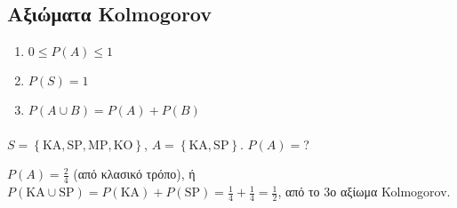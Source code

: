 \documentclass[11pt,a4paper,titlepage,draft]{article}
\begin{document}
\subsection{Αξιώματα \textlatin{Kolmogorov}}
\begin{enumerate}
\item \(0 \leq P(A) \leq 1\)
\item \( P(S) = 1\)
\item \( P(A \cup B) = P(A) + P(B) \)
\end{enumerate}

\paragraph{}
\(S= \left\lbrace \text{ΚΑ}, \text{SP},\text{MP},\text{KO} \right\rbrace\),
\(A=  \left\lbrace \text{KA}, \text{SP} \right\rbrace\). \(P(A) = \)?

\(P(A) = \frac{2}{4}\) (από κλασικό τρόπο), ή
\(P(\text{KA} \cup \text{SP}) = P(\text{KA})+P(\text{SP}) = \frac{1}{4} + \frac{1}{4}= \frac{1}{2}\), από το 3ο αξίωμα \textlatin{Kolmogorov}.
\end{document}
